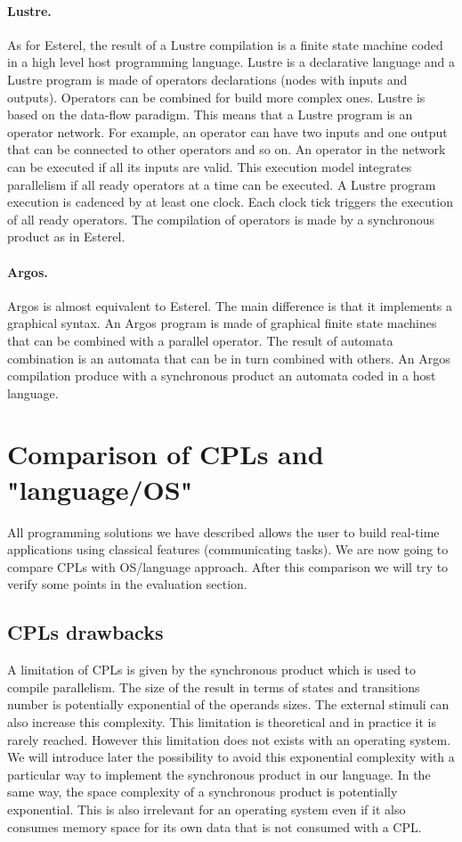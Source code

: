 \documentclass[10pt]{report}
\begin{document}
\paragraph{Lustre.} As for Esterel, the result of a Lustre compilation is a finite state machine coded in a high level host
programming language. Lustre is a declarative language and a Lustre program is made of operators declarations (nodes with inputs
and outputs). Operators can be combined for build more complex ones. Lustre is based on the data-flow paradigm. This means
that a Lustre program is an operator network. For example, an operator can have two inputs and one output that can be connected
to other operators and so on. An operator in the network can be executed if all its inputs are valid. This execution model
integrates parallelism if all ready operators at a time can be executed. A Lustre program execution is cadenced by at least one
clock. Each clock tick triggers the execution of all ready operators. The compilation of operators is made by a synchronous
product as in Esterel.

\paragraph{Argos.} Argos is almost equivalent to Esterel. The main difference is that it implements a graphical syntax. An
Argos program is made of graphical finite state machines that can be combined with a parallel operator. The result of automata
combination is an automata that can be in turn combined with others. An Argos compilation produce with a synchronous
product an automata coded in a host language.

\section{Comparison of CPLs and "language/OS"}

All programming solutions we have described allows the user to build real-time applications using classical features
(communicating tasks). We are now going to compare CPLs with OS/language approach. After this comparison we will try
to verify some points in the evaluation section.

\subsection{CPLs drawbacks}

A limitation of CPLs is given by the synchronous product which is used to compile parallelism. The size of the result
in terms of states and transitions number is potentially exponential of the operands sizes. The external stimuli can
also increase this complexity. This limitation is theoretical and in practice it is rarely reached. However this limitation
does not exists with an operating system. We will introduce later the possibility to avoid this exponential complexity
with a particular way to implement the synchronous product in our language. In the same way, the space complexity of a
synchronous product is potentially exponential. This is also irrelevant for an operating system even if it also
consumes memory space for its own data that is not consumed with a CPL.
\end{document}
